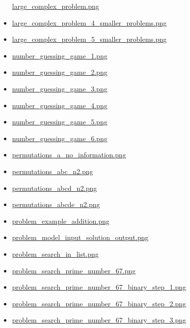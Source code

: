 \documentclass[
  letterpaper,
  DIV=11]{scrartcl}
\begin{document}
\begin{itemize}
  \href{images/large_complex_problem.png}{large\_complex\_problem.png}
\item
  \href{images/large_complex_problem_4_smaller_problems.png}{large\_complex\_problem\_4\_smaller\_problems.png}
\item
  \href{images/large_complex_problem_5_smaller_problems.png}{large\_complex\_problem\_5\_smaller\_problems.png}
\item
  \href{images/number_guessing_game_1.png}{number\_guessing\_game\_1.png}
\item
  \href{images/number_guessing_game_2.png}{number\_guessing\_game\_2.png}
\item
  \href{images/number_guessing_game_3.png}{number\_guessing\_game\_3.png}
\item
  \href{images/number_guessing_game_4.png}{number\_guessing\_game\_4.png}
\item
  \href{images/number_guessing_game_5.png}{number\_guessing\_game\_5.png}
\item
  \href{images/number_guessing_game_6.png}{number\_guessing\_game\_6.png}
\item
  \href{images/permutations_a_no_information.png}{permutations\_a\_no\_information.png}
\item
  \href{images/permutations_abc_n2.png}{permutations\_abc\_n2.png}
\item
  \href{images/permutations_abcd_n2.png}{permutations\_abcd\_n2.png}
\item
  \href{images/permutations_abcde_n2.png}{permutations\_abcde\_n2.png}
\item
  \href{images/problem_example_addition.png}{problem\_example\_addition.png}
\item
  \href{images/problem_model_input_solution_output.png}{problem\_model\_input\_solution\_output.png}
\item
  \href{images/problem_search_in_list.png}{problem\_search\_in\_list.png}
\item
  \href{images/problem_search_prime_number_67.png}{problem\_search\_prime\_number\_67.png}
\item
  \href{images/problem_search_prime_number_67_binary_step_1.png}{problem\_search\_prime\_number\_67\_binary\_step\_1.png}
\item
  \href{images/problem_search_prime_number_67_binary_step_2.png}{problem\_search\_prime\_number\_67\_binary\_step\_2.png}
\item
  \href{images/problem_search_prime_number_67_binary_step_3.png}{problem\_search\_prime\_number\_67\_binary\_step\_3.png}

\end{itemize}
\end{document}
